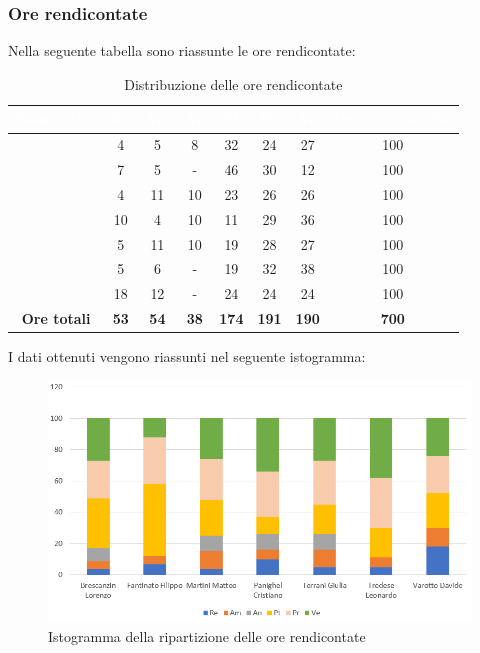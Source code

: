 \subsubsection{Ore rendicontate}
Nella seguente tabella sono riassunte le ore rendicontate:
\begin{table}[H]
	\begin{center}
		\begin{tabular}{ |c c c c c c c c| }
		\rowcolor{darkblue} 
		\textcolor{white}{\textbf{Nominativo}} & \textcolor{white}{\textbf{Re}} & \textcolor{white}{\textbf{Am}} & \textcolor{white}{\textbf{An}} & \textcolor{white}{\textbf{Pt}} & \textcolor{white}{\textbf{Pr}} & \textcolor{white}{\textbf{Ve}} & \textcolor{white}{\textbf{Ore Complessive}} \\ \hline
		\BL 	& 4  	& 5  	& 8 	& 32 	& 24 	& 27 	& 100 \\ \hline
		\FF 	& 7 	& 5 	& -		& 46 	& 30 	& 12 	& 100 \\ \hline
		\MM 	& 4  	& 11  	& 10 	& 23 	& 26 	& 26  	& 100 \\ \hline
		\PC 	& 10 	& 4  	& 10	& 11 	& 29	& 36 	& 100 \\ \hline
		\TG 	& 5  	& 11 	& 10 	& 19 	& 28 	& 27 	& 100 \\ \hline
		\TL 	& 5  	& 6 	& - 	& 19 	& 32 	& 38 	& 100 \\ \hline
		\VD 	& 18  	& 12  	& -		& 24 	& 24 	& 24 	& 100 \\ \hline
		\textbf{Ore totali} & \textbf{53} & \textbf{54} & \textbf{38} & \textbf{174} & \textbf{191} & \textbf{190} & \textbf{700} \\ \hline
	\end{tabular}
	\caption{Distribuzione delle ore rendicontate}
	\end{center}
\end{table}
I dati ottenuti vengono riassunti nel seguente istogramma:
\begin{figure}[H]
    \centering
    \includegraphics[scale = 0.70]{Immagini/TotaleRendicontatoIsto.png}
    \caption{Istogramma della ripartizione delle ore rendicontate}
    \label{fig:Istogramma ripartizione ore totali rendicontate}
\end{figure}
